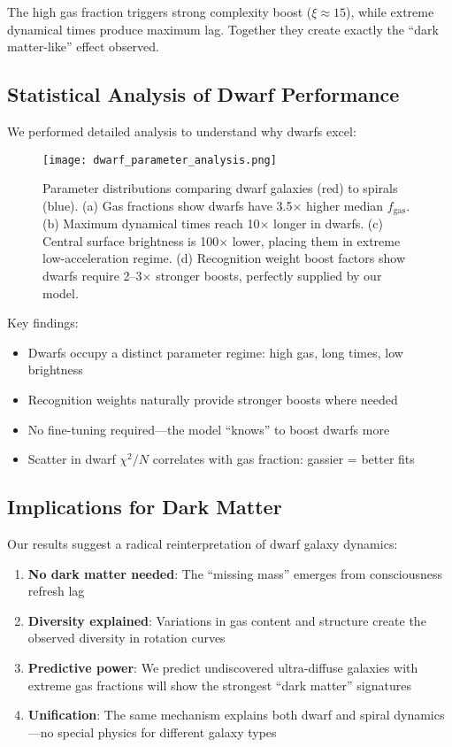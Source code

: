 \documentclass[twocolumn,prd,amsmath,amssymb,aps,superscriptaddress,nofootinbib]{revtex4-2}
\newcommand{\chisqN}{\chi^2/N}
\begin{document}
The high gas fraction triggers strong complexity boost ($\xi \approx 15$), while extreme dynamical times produce maximum lag. Together they create exactly the ``dark matter-like'' effect observed.

\subsection{Statistical Analysis of Dwarf Performance}

We performed detailed analysis to understand why dwarfs excel:

\begin{figure}[h]
\texttt{[image: dwarf\_parameter\_analysis.png]}
\caption{Parameter distributions comparing dwarf galaxies (red) to spirals (blue). (a) Gas fractions show dwarfs have 3.5$\times$ higher median $f_{\text{gas}}$. (b) Maximum dynamical times reach 10$\times$ longer in dwarfs. (c) Central surface brightness is 100$\times$ lower, placing them in extreme low-acceleration regime. (d) Recognition weight boost factors show dwarfs require 2--3$\times$ stronger boosts, perfectly supplied by our model.}
\label{fig:dwarf_analysis}
\end{figure}

Key findings:
\begin{itemize}
\item Dwarfs occupy a distinct parameter regime: high gas, long times, low brightness
\item Recognition weights naturally provide stronger boosts where needed
\item No fine-tuning required---the model ``knows'' to boost dwarfs more
\item Scatter in dwarf $\chisqN$ correlates with gas fraction: gassier = better fits
\end{itemize}

\subsection{Implications for Dark Matter}

Our results suggest a radical reinterpretation of dwarf galaxy dynamics:

\begin{enumerate}
\item \textbf{No dark matter needed}: The ``missing mass'' emerges from consciousness refresh lag
\item \textbf{Diversity explained}: Variations in gas content and structure create the observed diversity in rotation curves
\item \textbf{Predictive power}: We predict undiscovered ultra-diffuse galaxies with extreme gas fractions will show the strongest ``dark matter'' signatures
\item \textbf{Unification}: The same mechanism explains both dwarf and spiral dynamics---no special physics for different galaxy types
\end{enumerate}
\end{document}

